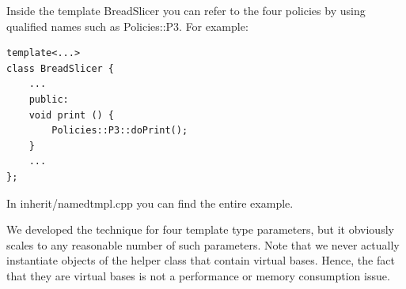 Inside the template BreadSlicer you can refer to the four policies by using qualified names such as Policies::P3. For example:

\begin{lstlisting}[style=styleCXX]
template<...>
class BreadSlicer {
	...
	public:
	void print () {
		Policies::P3::doPrint();
	}
	...
};
\end{lstlisting}

In inherit/namedtmpl.cpp you can find the entire example.

We developed the technique for four template type parameters, but it obviously scales to any reasonable number of such parameters. Note that we never actually instantiate objects of the helper class that contain virtual bases. Hence, the fact that they are virtual bases is not a performance or memory consumption issue.






